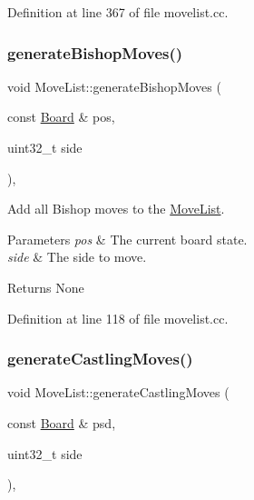 Definition at line 367 of file movelist.\+cc.

\mbox{\label{classMoveList_a65a2fdca6072299405610f1770dde58e}} 
\subsubsection{\texorpdfstring{generate\+Bishop\+Moves()}{generateBishopMoves()}}
{\footnotesize\ttfamily void Move\+List\+::generate\+Bishop\+Moves (\begin{DoxyParamCaption}\item[{const \mbox{\hyperlink{classBoard}{Board}} \&}]{pos,  }\item[{uint32\+\_\+t}]{side }\end{DoxyParamCaption})\hspace{0.3cm}{\ttfamily [private]}, {\ttfamily [noexcept]}}



Add all Bishop moves to the \mbox{\hyperlink{classMoveList}{Move\+List}}. 


\begin{DoxyParams}{Parameters}
{\em pos} & The current board state. \\
\hline
{\em side} & The side to move. \\
\hline
\end{DoxyParams}
\begin{DoxyReturn}{Returns}
None 
\end{DoxyReturn}


Definition at line 118 of file movelist.\+cc.

\mbox{\label{classMoveList_ae0f3fcb8d21bf22c9e7509308d5fc9fe}} 
\subsubsection{\texorpdfstring{generate\+Castling\+Moves()}{generateCastlingMoves()}}
{\footnotesize\ttfamily void Move\+List\+::generate\+Castling\+Moves (\begin{DoxyParamCaption}\item[{const \mbox{\hyperlink{classBoard}{Board}} \&}]{psd,  }\item[{uint32\+\_\+t}]{side }\end{DoxyParamCaption})\hspace{0.3cm}{\ttfamily [private]}, {\ttfamily [noexcept]}}



